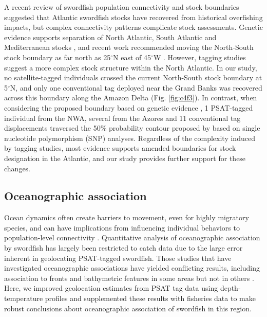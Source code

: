 A recent review of swordfish population connectivity and stock boundaries \citep{Neilson2013} suggested that Atlantic swordfish stocks have recovered from historical overfishing impacts, but complex connectivity patterns complicate stock assessments. Genetic evidence supports separation of North Atlantic, South Atlantic and Mediterranean stocks \citep{Bremer1996, AlvaradoBremer2005a, Smith2015}, and recent work recommended moving the North-South stock boundary as far north as 25$^{\circ}$N east of 45$^{\circ}$W \citep{Smith2015}. However, tagging studies \citep{Abascal2015} suggest a more complex stock structure within the North Atlantic. In our study, no satellite-tagged individuals crossed the current North-South stock boundary at 5$^{\circ}$N, and only one conventional tag deployed near the Grand Banks was recovered across this boundary along the Amazon Delta (Fig. \ref{fig:c4f3}). In contrast, when considering the proposed boundary based on genetic evidence \citep{Smith2015}, 1 PSAT-tagged individual from the NWA, several from the Azores and 11 conventional tag displacements traversed the 50\% probability contour proposed by \citet{Smith2015} based on single nucleotide polymorphism (SNP) analyses. Regardless of the complexity induced by tagging studies, most evidence supports amended boundaries for stock designation in the Atlantic, and our study provides further support for these changes.

\subsection{Oceanographic association}

Ocean dynamics often create barriers to movement, even for highly migratory species, and can have implications from influencing individual behaviors \citep{Stramma2012} to population-level connectivity \citep{Galarza2009, Selkoe2010}. Quantitative analysis of oceanographic association by swordfish has largely been restricted to catch data \citep[e.g.][]{Podesta1993} due to the large error inherent in geolocating PSAT-tagged swordfish. Those studies that have investigated oceanographic associations have yielded conflicting results, including association to fronts and bathymetric features in some areas \citep{Sedberry2001} but not in others \citep{Abascal2010}. Here, we improved geolocation estimates from PSAT tag data using depth-temperature profiles and supplemented these results with fisheries data to make robust conclusions about oceanographic association of swordfish in this region.

